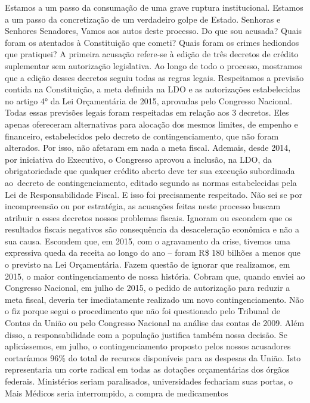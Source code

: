 Estamos a um passo da consumação de uma grave ruptura institucional.
Estamos a um passo da concretização de um verdadeiro golpe de Estado.
Senhoras e Senhores Senadores, Vamos aos autos deste processo. Do que
sou acusada? Quais foram os atentados à Constituição que cometi? Quais
foram os crimes hediondos que pratiquei? A primeira acusação refere-se à
edição de três decretos de crédito suplementar sem autorização
legislativa. Ao longo de todo o processo, mostramos que a edição desses
decretos seguiu todas as regras legais. Respeitamos a previsão contida
na Constituição, a meta definida na LDO e as autorizações estabelecidas
no artigo 4° da Lei Orçamentária de 2015, aprovadas pelo Congresso
Nacional. Todas essas previsões legais foram respeitadas em relação aos
3 decretos. Eles apenas ofereceram alternativas para alocação dos mesmos
limites, de empenho e financeiro, estabelecidos pelo decreto de
contingenciamento, que não foram alterados. Por isso, não afetaram em
nada a meta fiscal. Ademais, desde 2014, por iniciativa do Executivo, o
Congresso aprovou a inclusão, na LDO, da obrigatoriedade que qualquer
crédito aberto deve ter sua execução subordinada ao~decreto de
contingenciamento, editado segundo as normas estabelecidas pela Lei de
Responsabilidade Fiscal. E isso foi precisamente respeitado. Não sei se
por incompreensão ou por estratégia, as acusações feitas neste processo
buscam atribuir a esses decretos nossos problemas fiscais. Ignoram ou
escondem que os resultados fiscais negativos são consequência da
desaceleração econômica e não a sua causa. Escondem que, em 2015, com o
agravamento da crise, tivemos uma expressiva queda da receita ao longo
do ano -- foram R\$ 180 bilhões a menos que o previsto na Lei
Orçamentária. Fazem questão de ignorar que realizamos, em 2015, o maior
contingenciamento de nossa história. Cobram que, quando enviei ao
Congresso Nacional, em julho de 2015, o pedido de autorização para
reduzir a meta fiscal, deveria ter imediatamente realizado um novo
contingenciamento. Não o fiz porque segui o procedimento que não foi
questionado pelo Tribunal de Contas da União ou pelo Congresso Nacional
na análise das contas de 2009. Além disso, a responsabilidade com a
população justifica também nossa decisão. Se aplicássemos, em julho, o
contingenciamento proposto pelos nossos acusadores cortaríamos 96\% do
total de recursos disponíveis para as despesas da União. Isto
representaria um corte radical em todas as dotações orçamentárias dos
órgãos federais. Ministérios seriam paralisados, universidades fechariam
suas portas, o Mais Médicos seria interrompido, a compra de medicamentos
